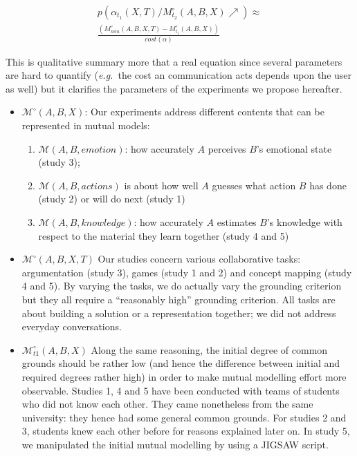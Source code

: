 \documentclass[twocolumn]{article}
\newcommand{\eg}{{\textit{e.g.\ }}}
\newcommand{\model}[3]{{$\mathcal{M}(#1, #2, #3)$}}
\newcommand{\Model}[3]{{$\mathcal{M}^{\circ}(#1, #2, #3)$}}
\begin{document}
\begin{multline} \label{eq:probrepair}
p(\alpha_{t_1}(X,T) / M^{\circ}_{t_2}(A,B,X) \nearrow) \approx \\
\frac{(M^{\circ}_{min}(A,B,X,T) - M^{\circ}_{t_1}(A,B,X))}{cost (\alpha)}
\end{multline}

This is qualitative summary more that a real equation since several parameters
are hard to quantify (\eg the cost an communication acts depends upon the user
as well) but it clarifies the parameters of the experiments we propose hereafter.

\begin{itemize}
    \item \Model{A}{B}{X}: Our experiments address different contents that can be
        represented in mutual models:

    \begin{enumerate}
        \item \model{A}{B}{emotion}: how accurately $A$ perceives $B$'s emotional state
            (study 3); 

        \item \model{A}{B}{actions} is about how well $A$ guesses what action $B$ has
            done (study 2) or will do next  (study 1)

        \item \model{A}{B}{knowledge}: how accurately $A$ estimates $B$'s knowledge
            with respect to the material they learn together (study 4 and 5)

    \end{enumerate}



    \item \Model{A,B}{X}{T} Our studies concern various collaborative tasks:
        argumentation (study 3), games (study 1 and 2) and concept mapping
        (study 4 and 5). By varying the tasks, we do actually vary the grounding
        criterion but they all require a ``reasonably high'' grounding criterion.
        All tasks are about building a solution or a representation together; we
        did not address everyday conversations. 

    \item $\mathcal{M}^{\circ}_{t1}(A,B,X)$ Along the same reasoning, the initial degree
        of common grounds should be rather low (and hence the difference between
        initial and required degrees rather high) in order to make mutual
        modelling effort more observable. Studies 1, 4 and 5 have been conducted
        with teams of students who did not know each other. They came
        nonetheless from the same university: they hence had some general common
        grounds.  For studies 2 and 3, students knew each other before for
        reasons explained later on. In study 5, we manipulated the initial mutual modelling by
        using a JIGSAW script.


\end{itemize}
\end{document}
